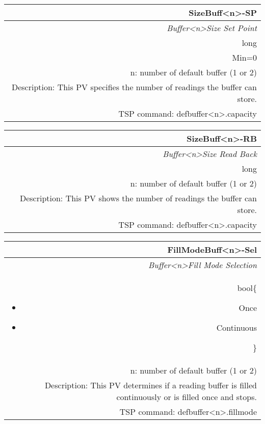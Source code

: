 \documentclass[openany]{article}
\begin{document}
		\begin{tabular}{N}
			\hline
			\bfseries SizeBuff\textless n\textgreater-SP\label{pv:sizebuff-sp} \\ \hline
			\emph{Buffer\textless n\textgreater Size Set Point} \\
			long \\
			Min=0 \\
			n: number of default buffer (1 or 2) \\
			Description: This PV specifies the number of readings the buffer can store. \\
			TSP command: defbuffer\textless n\textgreater.capacity
		\end{tabular}

		\begin{tabular}{N}
			\hline
			\bfseries SizeBuff\textless n\textgreater-RB\label{pv:sizebuff-rb} \\ \hline
			\emph{Buffer\textless n\textgreater Size Read Back} \\
			long \\
			n: number of default buffer (1 or 2) \\
			Description: This PV shows the number of readings the buffer can store. \\
			TSP command: defbuffer\textless n\textgreater.capacity
		\end{tabular}

		\begin{tabular}{N}
			\hline
			\bfseries FillModeBuff\textless n\textgreater-Sel\label{pv:fillmodebuff-sel} \\ \hline
			\emph{Buffer\textless n\textgreater Fill Mode Selection} \\
			bool\{\begin{itemize}[noitemsep]
				\small
				\item[] Once
				\item[] Continuous
			\end{itemize}\} \\
			n: number of default buffer (1 or 2) \\
			Description: This PV determines if a reading buffer is filled continuously or is filled once and stops. \\
			TSP command: defbuffer\textless n\textgreater.fillmode
		\end{tabular}
\end{document}

